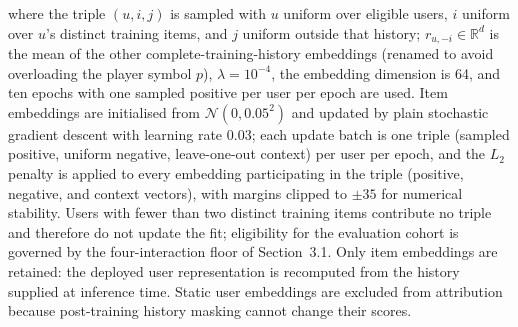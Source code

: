\documentclass[pdflatex,sn-mathphys-num]{sn-jnl}
\theoremstyle{thmstyleone}
\theoremstyle{thmstyletwo}
\theoremstyle{thmstylethree}
\begin{document}
where the triple $(u,i,j)$ is sampled with $u$ uniform over eligible users, $i$ uniform over $u$'s distinct training items, and $j$ uniform outside that history; $r_{u,-i}\in\mathbb R^d$ is the mean of the other complete-training-history embeddings (renamed to avoid overloading the player symbol $p$), $\lambda=10^{-4}$, the embedding dimension is 64, and ten epochs with one sampled positive per user per epoch are used. Item embeddings are initialised from $\mathcal{N}(0,0.05^2)$ and updated by plain stochastic gradient descent with learning rate $0.03$; each update batch is one triple (sampled positive, uniform negative, leave-one-out context) per user per epoch, and the $L_2$ penalty is applied to every embedding participating in the triple (positive, negative, and context vectors), with margins clipped to $\pm35$ for numerical stability. Users with fewer than two distinct training items contribute no triple and therefore do not update the fit; eligibility for the evaluation cohort is governed by the four-interaction floor of Section~3.1. Only item embeddings are retained: the deployed user representation is recomputed from the history supplied at inference time. Static user embeddings are excluded from attribution because post-training history masking cannot change their scores.
\end{document}
